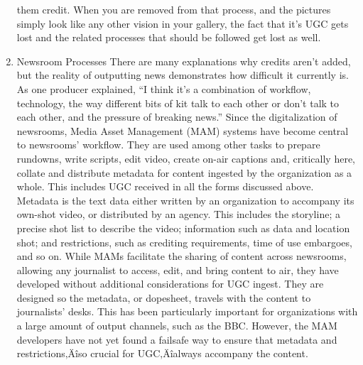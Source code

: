 \documentclass[symmetric, notoc, nobib]{towcenter-book}
\begin{document}
\begin{enumerate}
them credit. When you are removed from that process, and the pictures
simply look like any other vision in your gallery, the fact that it's UGC gets
lost and the related processes that should be followed get lost as well.
\item Newsroom Processes
There are many explanations why credits aren't added, but the reality of
outputting news demonstrates how difficult it currently is.
As one producer explained, ``I think it's a combination of workflow, technology,
the way different bits of kit talk to each other or don't talk to each other,
and the pressure of breaking news.''
Since the digitalization of newsrooms, Media Asset Management (MAM)
systems have become central to newsrooms' workflow. They are used
among other tasks to prepare rundowns, write scripts, edit video, create
on-air captions and, critically here, collate and distribute metadata for content
ingested by the organization as a whole. This includes UGC received in
all the forms discussed above. Metadata is the text data either written by an
organization to accompany its own-shot video, or distributed by an agency.
This includes the storyline; a precise shot list to describe the video; information
such as data and location shot; and restrictions, such as crediting
requirements, time of use embargoes, and so on.
While MAMs facilitate the sharing of content across newsrooms, allowing
any journalist to access, edit, and bring content to air, they have developed
without additional considerations for UGC ingest. They are designed so the
metadata, or dopesheet, travels with the content to journalists' desks. This
has been particularly important for organizations with a large amount of
output channels, such as the BBC. However, the MAM developers have not
yet found a failsafe way to ensure that metadata and restrictions‚Äîso crucial
for UGC‚Äîalways accompany the content.


\end{enumerate}
\end{document}

